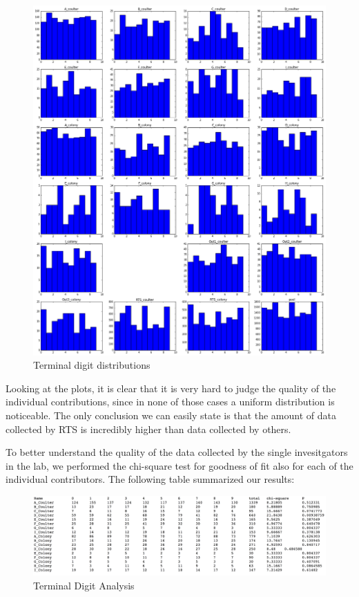 \documentclass{article}
\begin{document}
\begin{figure}[htbp]
\centering
\includegraphics{images/term_plot.png}
\caption{Terminal digit distributions}
\end{figure}

Looking at the plots, it is clear that it is very hard to judge the
quality of the individual contributions, since in none of those cases a
uniform distribution is noticeable. The only conclusion we can easily
state is that the amount of data collected by RTS is incredibly higher
than data collected by others.

To better understand the quality of the data collected by the single
invesitgators in the lab, we performed the chi-square test for goodness
of fit also for each of the individual contributors. The following table
summarized our results:

\begin{figure}[htbp]
\centering
\includegraphics{images/term_inv_tab.png}
\caption{Terminal Digit Analysis}
\end{figure}
\end{document}
